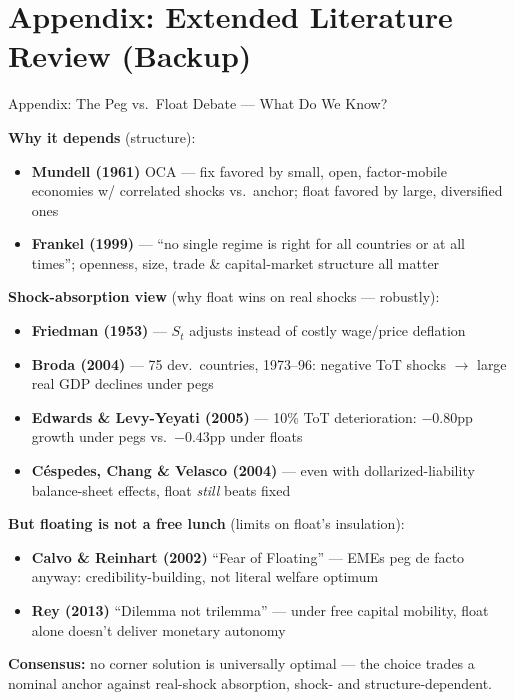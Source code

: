 \section*{Appendix: Extended Literature Review (Backup)}
\begin{frame}{Appendix: The Peg vs.\ Float Debate --- What Do We Know?}
\hypertarget{littfull}{}

{\footnotesize \textbf{Why it depends} (structure):}
{\scriptsize
\begin{itemize}\setlength{\itemsep}{1pt}
\item \textbf{Mundell (1961)} OCA --- fix favored by small, open, factor-mobile economies w/ correlated shocks vs.\ anchor; float favored by large, diversified ones
\item \textbf{Frankel (1999)} --- ``no single regime is right for all countries or at all times''; openness, size, trade \& capital-market structure all matter
\end{itemize}}

\vspace{2pt}
{\footnotesize \textbf{Shock-absorption view} (why float wins on real shocks --- robustly):}
{\scriptsize
\begin{itemize}\setlength{\itemsep}{1pt}
\item \textbf{Friedman (1953)} --- $S_t$ adjusts instead of costly wage/price deflation
\item \textbf{Broda (2004)} --- 75 dev.\ countries, 1973--96: negative ToT shocks $\to$ large real GDP declines under pegs
\item \textbf{Edwards \& Levy-Yeyati (2005)} --- 10\% ToT deterioration: $-0.80$pp growth under pegs vs.\ $-0.43$pp under floats
\item \textbf{Céspedes, Chang \& Velasco (2004)} --- even with dollarized-liability balance-sheet effects, float \emph{still} beats fixed
\end{itemize}}

\vspace{2pt}
{\footnotesize \textbf{But floating is not a free lunch} (limits on float's insulation):}
{\scriptsize
\begin{itemize}\setlength{\itemsep}{1pt}
\item \textbf{Calvo \& Reinhart (2002)} ``Fear of Floating'' --- EMEs peg de facto anyway: credibility-building, not literal welfare optimum
\item \textbf{Rey (2013)} ``Dilemma not trilemma'' --- under free capital mobility, float alone doesn't deliver monetary autonomy
\end{itemize}}

\vspace{3pt}
{\scriptsize \textbf{Consensus:} no corner solution is universally optimal --- the choice trades a nominal anchor against real-shock absorption, shock- and structure-dependent.}

\end{frame}

